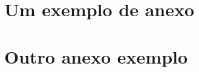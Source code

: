 \documentclass[tcc,ec]{texfurg} %
\begin{document}




\annex
\chapter{Um exemplo de anexo}

\lipsum[10-12]

\chapter{Outro anexo exemplo}

\lipsum[13-14]
\end{document}
